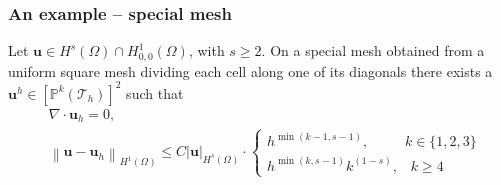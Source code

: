 \documentclass{beamer}
\let\vec\mathbf
\newcommand{\norm}[1]{\left\lVert#1\right\rVert}
\newcommand{\abs}[1]{\left|#1\right|}
\begin{document}
	\begin{frame}
		\frametitle{An example -- special mesh}
		\begin{lemma}
			Let $\vec{u} \in H^s(\Omega)\cap H^{1}_{0,0}(\Omega)$, with $s\geq 2$. On a special mesh obtained from a uniform square mesh dividing each cell along one of its diagonals there exists a $\vec{u}^h \in [\mathbb{P}^k(\mathcal{T}_h) ]^2$ such that
			\begin{align}
				&\nabla\cdot \vec{u}_h = 0, \\
				&\norm{\vec{u}-\vec{u}_h}_{H^1(\Omega)} \leq C\abs{\vec{u}}_{H^s(\Omega)}\cdot \begin{cases}
					h^{\min(k-1,s-1)},\;\;\qquad k\in \{1,2,3\}\\
					h^{\min(k,s-1)}k^{(1-s)},\;\;\; k \geq 4
				\end{cases}
			\end{align}
		\end{lemma}
	\end{frame}
\end{document}
